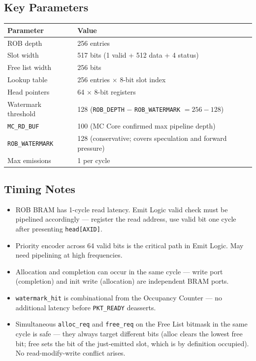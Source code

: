 \subsection{Key Parameters}

\begin{center}
\begin{tabular}{ll}
\toprule
\textbf{Parameter} & \textbf{Value} \\
\midrule
ROB depth             & 256 entries \\
Slot width            & 517 bits (1 valid + 512 data + 4 status) \\
Free list width       & 256 bits \\
Lookup table          & 256 entries $\times$ 8-bit slot index \\
Head pointers         & 64 $\times$ 8-bit registers \\
Watermark threshold   & 128 (\texttt{ROB\_DEPTH} $-$ \texttt{ROB\_WATERMARK} $= 256 - 128$) \\
\texttt{MC\_RD\_BUF}  & 100 (MC Core confirmed max pipeline depth) \\
\texttt{ROB\_WATERMARK} & 128 (conservative; covers speculation and forward pressure) \\
Max emissions         & 1 per cycle \\
\bottomrule
\end{tabular}
\end{center}

\subsection{Timing Notes}

\begin{itemize}[noitemsep]
  \item ROB BRAM has 1-cycle read latency. Emit Logic valid check must be pipelined accordingly — register the read address, use valid bit one cycle after presenting \texttt{head[AXID]}.
  \item Priority encoder across 64 valid bits is the critical path in Emit Logic. May need pipelining at high frequencies.
  \item Allocation and completion can occur in the same cycle — write port (completion) and init write (allocation) are independent BRAM ports.
  \item \texttt{watermark\_hit} is combinational from the Occupancy Counter — no additional
        latency before \texttt{PKT\_READY} deasserts.
  \item Simultaneous \texttt{alloc\_req} and \texttt{free\_req} on the Free List bitmask in
        the same cycle is safe — they always target different bits (alloc clears the lowest
        free bit; free sets the bit of the just-emitted slot, which is by definition occupied).
        No read-modify-write conflict arises.
\end{itemize}